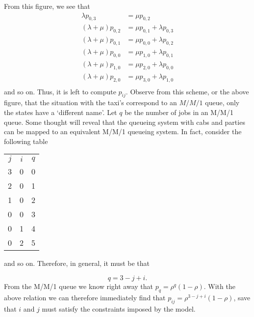 \begin{exercise}{\faPhoto}
\begin{solution}
\begin{center}
      
    \end{center}

From this figure, we see that
\begin{align*}
\lambda p_{0,3} &= \mu p_{0,2} \\
(\lambda+\mu) p_{0,2} &= \mu p_{0,1} + \lambda p_{0,3}\\
(\lambda+\mu) p_{0,1} &= \mu p_{0,0} + \lambda p_{0,2}\\
(\lambda+\mu) p_{0,0} &= \mu p_{1,0} + \lambda p_{0,1}\\
(\lambda+\mu) p_{1,0} &= \mu p_{2,0} + \lambda p_{0,0}\\
(\lambda+\mu) p_{2,0} &= \mu p_{3,0} + \lambda p_{1,0}\\
\end{align*}
and so on. Thus, it is left to compute $p_{ij}$. Observe from this
scheme, or the above figure, that the situation with the taxi's
correspond to an $M/M/1$ queue, only the states have a `different
name'. Let $q$ be the number of jobs in an M/M/1 queue. Some thought
will reveal that the queueing system with cabs and parties can be
mapped to an equivalent M/M/1 queueing system. In fact, consider the
following table
\begin{center}
\begin{tabular}{ccc}
$j$ & $i$ & $q$\\
3&         0 &         0\\
2 &        0&          1\\
1 &        0&          2\\
0&         0&          3\\
0&         1&          4\\
0&         2&          5\\
\end{tabular}
\end{center}
and so on. Therefore, in general, it must be that 

\begin{equation*}
q = 3 - j +i.
\end{equation*}
From the M/M/1 queue we know right away that $p_q = \rho^q
(1-\rho)$.  With the above relation we can therefore immediately find
that $p_{ij} = \rho^{3-j+i}(1-\rho)$, save that $i$ and
$j$ must satisfy the constraints imposed by the model.


\end{solution}
\end{exercise}

